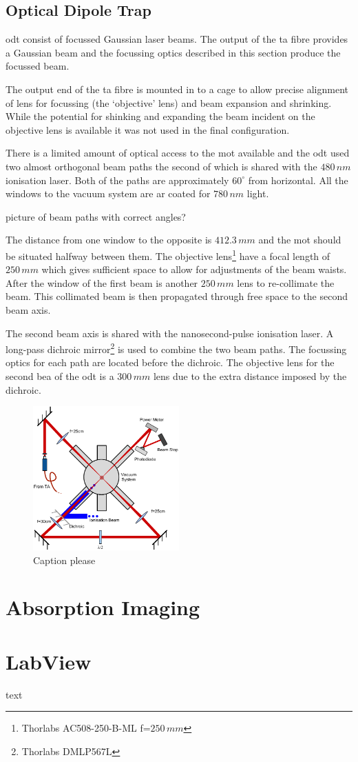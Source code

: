 \subsection{Optical Dipole Trap}

\Gls{odt} consist of focussed Gaussian laser beams. The output of the \gls{ta} fibre provides a Gaussian beam and the focussing optics described in this section produce the focussed beam.

The output end of the \gls{ta} fibre is mounted in to a cage to allow precise alignment of lens for focussing (the `objective' lens) and beam expansion and shrinking. While the potential for shinking and expanding the beam incident on the objective lens is available it was not used in the final configuration.

There is a limited amount of optical access to the \gls{mot} available and the \gls{odt} used two almost orthogonal beam paths the second of which is shared with the $480\,\unit{nm}$ ionisation laser. Both of the paths are approximately $60^{\circ}$ from horizontal. All the windows to the vacuum system are \gls{ar} coated for $780\,\unit{nm}$ light.

{\color{red} picture of beam paths with correct angles?}

The distance from one window to the opposite is $412.3\,\unit{mm}$ and the \gls{mot} should be situated halfway between them. The objective lens\footnote{Thorlabs AC508-250-B-ML f=$250\,\unit{mm}$} have a focal length of $250\,\unit{mm}$ which gives sufficient space to allow for adjustments of the beam waists. After the window of the first beam is another $250\,\unit{mm}$ lens to re-collimate the beam. This collimated beam is then propagated through free space to the second beam axis.

The second beam axis is shared with the nanosecond-pulse ionisation laser. A long-pass dichroic mirror\footnote{Thorlabs DMLP567L} is used to combine the two beam paths. The focussing optics for each path are located before the dichroic. The objective lens for the second bea of the \gls{odt} is a $300\,\unit{mm}$ lens due to the extra distance imposed by the dichroic.


\begin{figure}[h]
\centering
\includegraphics[width=0.5\textwidth]{figs/DipoleTrapRig.pdf}
\caption{{\color{red} Caption please}}
\end{figure}

\section{Absorption Imaging}



\section{LabView}
text
